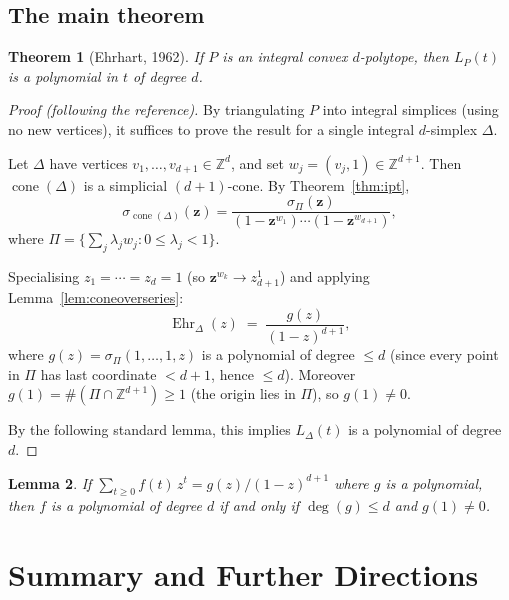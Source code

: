 \documentclass[11pt]{article}
\theoremstyle{plain}
\newtheorem{theorem}{Theorem}[section]
\newtheorem{lemma}[theorem]{Lemma}
\theoremstyle{definition}
\newcommand{\Z}{\mathbb{Z}}
\newcommand{\cone}{\operatorname{cone}}
\begin{document}
\subsection{The main theorem}

\begin{theorem}[Ehrhart, 1962]
  \label{thm:ehrhart}
  If $P$ is an integral convex $d$-polytope, then $L_P(t)$ is a polynomial in
  $t$ of degree $d$.
\end{theorem}

\begin{proof}[Proof (following the reference)]
  By triangulating $P$ into integral simplices (using no new vertices), it
  suffices to prove the result for a single integral $d$-simplex $\Delta$.

  Let $\Delta$ have vertices $v_1, \ldots, v_{d+1} \in \Z^d$, and set
  $w_j = (v_j, 1) \in \Z^{d+1}$.  Then $\cone(\Delta)$ is a simplicial
  $(d+1)$-cone.  By Theorem~\ref{thm:ipt},
  \[
    \sigma_{\cone(\Delta)}(\mathbf{z})
    = \frac{\sigma_\Pi(\mathbf{z})}
           {(1-\mathbf{z}^{w_1})\cdots(1-\mathbf{z}^{w_{d+1}})},
  \]
  where $\Pi = \{\sum_j \lambda_j w_j : 0 \leq \lambda_j < 1\}$.

  Specialising $z_1 = \cdots = z_d = 1$ (so $\mathbf{z}^{w_k} \to z_{d+1}^1$)
  and applying Lemma~\ref{lem:coneoverseries}:
  \[
    \operatorname{Ehr}_\Delta(z)
    \;=\; \frac{g(z)}{(1-z)^{d+1}},
  \]
  where $g(z) = \sigma_\Pi(1,\ldots,1,z)$ is a polynomial of degree $\leq d$
  (since every point in $\Pi$ has last coordinate $< d+1$, hence $\leq d$).
  Moreover $g(1) = \#(\Pi \cap \Z^{d+1}) \geq 1$ (the origin lies in $\Pi$),
  so $g(1) \neq 0$.

  By the following standard lemma, this implies $L_\Delta(t)$ is a polynomial
  of degree $d$.
\end{proof}

\begin{lemma}
  If $\sum_{t \geq 0} f(t)\, z^t = g(z)/(1-z)^{d+1}$ where $g$ is a
  polynomial, then $f$ is a polynomial of degree $d$ if and only if
  $\deg(g) \leq d$ and $g(1) \neq 0$.
\end{lemma}

\section{Summary and Further Directions}
\end{document}

